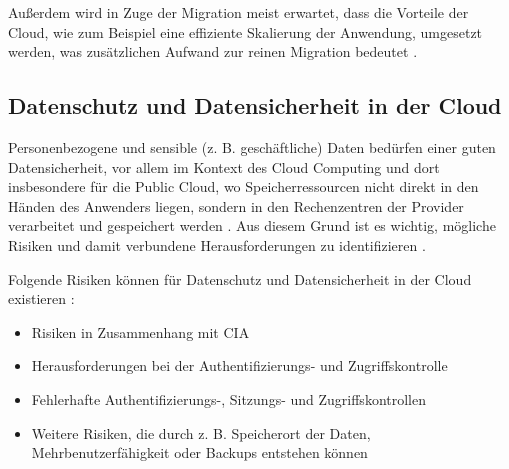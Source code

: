 Außerdem wird in Zuge der Migration meist erwartet, dass die Vorteile der Cloud, wie zum Beispiel eine effiziente Skalierung der Anwendung, umgesetzt werden, was zusätzlichen Aufwand zur reinen Migration bedeutet \cite[Vgl.][]{Ibryam2021}. \pagebreak

\subsection{Datenschutz und Datensicherheit in der Cloud}
Personenbezogene und sensible (z. B. geschäftliche) Daten bedürfen einer guten Datensicherheit, vor allem im Kontext des Cloud Computing und dort insbesondere für die Public Cloud, wo Speicherressourcen nicht direkt in den Händen des Anwenders liegen, sondern in den Rechenzentren der Provider verarbeitet und gespeichert werden \cite[Vgl.][S. 1ff]{Sun2019}. Aus diesem Grund ist es wichtig, mögliche Risiken und damit verbundene Herausforderungen zu identifizieren \cite[Vgl.][S. 3]{Sun2019}.

Folgende Risiken können für Datenschutz und Datensicherheit in der Cloud existieren \cite[Vgl. auch im folgenden][S. 694]{Kumar2018}:

\begin{itemize}
    \item Risiken in Zusammenhang mit \ac{CIA} 
    \item Herausforderungen bei der Authentifizierungs- und Zugriffskontrolle
    \item Fehlerhafte Authentifizierungs-, Sitzungs- und Zugriffskontrollen
    \item Weitere Risiken, die durch z. B. Speicherort der Daten, Mehrbenutzerfähigkeit oder Backups entstehen können
\end{itemize}

\pagebreak